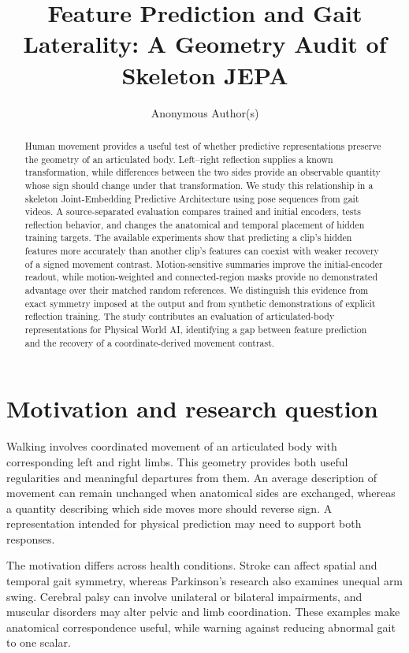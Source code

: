 \documentclass{article}
\title{Feature Prediction and Gait Laterality: A Geometry Audit of Skeleton JEPA}
\author{Anonymous Author(s)}
\begin{document}
\maketitle
\begin{abstract}
Human movement provides a useful test of whether predictive representations preserve the geometry of an articulated body. Left--right reflection supplies a known transformation, while differences between the two sides provide an observable quantity whose sign should change under that transformation. We study this relationship in a skeleton Joint-Embedding Predictive Architecture using pose sequences from gait videos. A source-separated evaluation compares trained and initial encoders, tests reflection behavior, and changes the anatomical and temporal placement of hidden training targets. The available experiments show that predicting a clip's hidden features more accurately than another clip's features can coexist with weaker recovery of a signed movement contrast. Motion-sensitive summaries improve the initial-encoder readout, while motion-weighted and connected-region masks provide no demonstrated advantage over their matched random references. We distinguish this evidence from exact symmetry imposed at the output and from synthetic demonstrations of explicit reflection training. The study contributes an evaluation of articulated-body representations for Physical World AI, identifying a gap between feature prediction and the recovery of a coordinate-derived movement contrast.
\end{abstract}
\section{Motivation and research question}\label{motivation-and-research-question}

Walking involves coordinated movement of an articulated body with corresponding left and right limbs. This geometry provides both useful regularities and meaningful departures from them. An average description of movement can remain unchanged when anatomical sides are exchanged, whereas a quantity describing which side moves more should reverse sign. A representation intended for physical prediction may need to support both responses.

The motivation differs across health conditions. Stroke can affect spatial and temporal gait symmetry, whereas Parkinson's research also examines unequal arm swing. Cerebral palsy can involve unilateral or bilateral impairments, and muscular disorders may alter pelvic and limb coordination. These examples make anatomical correspondence useful, while warning against reducing abnormal gait to one scalar.
\end{document}

